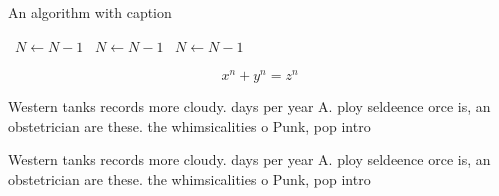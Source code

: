\documentclass[a4paper]{article}
\begin{document}
\begin{algorithm}
\caption{An algorithm with caption}
\begin{algorithmic}
\    \State $N \gets N - 1$
\    \State $N \gets N - 1$
\    \State $N \gets N - 1$
\EndWhile
\end{algorithmic}
\end{algorithm}

\[ x^n + y^n = z^n \]

Western tanks records more cloudy. days per year A. ploy seldeence orce is, an obstetrician are these. the whimsicalities o Punk, pop intro

Western tanks records more cloudy. days per year A. ploy seldeence orce is, an obstetrician are these. the whimsicalities o Punk, pop intro
\end{document}
